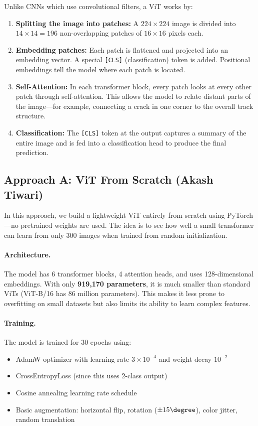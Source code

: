 \documentclass[10pt,twocolumn,letterpaper]{article}
\begin{document}
Unlike CNNs which use convolutional filters, a ViT works by:
\begin{enumerate}[leftmargin=*, itemsep=2pt]
    \item \textbf{Splitting the image into patches:} A $224\times224$ image is divided into $14 \times 14 = 196$ non-overlapping patches of $16 \times 16$ pixels each.
    \item \textbf{Embedding patches:} Each patch is flattened and projected into an embedding vector. A special \texttt{[CLS]} (classification) token is added. Positional embeddings tell the model where each patch is located.
    \item \textbf{Self-Attention:} In each transformer block, every patch looks at every other patch through self-attention. This allows the model to relate distant parts of the image---for example, connecting a crack in one corner to the overall track structure.
    \item \textbf{Classification:} The \texttt{[CLS]} token at the output captures a summary of the entire image and is fed into a classification head to produce the final prediction.
\end{enumerate}


\subsection{Approach A: ViT From Scratch (Akash Tiwari)}

In this approach, we build a lightweight ViT entirely from scratch using PyTorch---no pretrained weights are used. The idea is to see how well a small transformer can learn from only 300 images when trained from random initialization.

\paragraph{Architecture.}
The model has 6 transformer blocks, 4 attention heads, and uses 128-dimensional embeddings. With only \textbf{919,170 parameters}, it is much smaller than standard ViTs (ViT-B/16 has 86 million parameters). This makes it less prone to overfitting on small datasets but also limits its ability to learn complex features.

\paragraph{Training.}
The model is trained for 30 epochs using:
\begin{itemize}[leftmargin=*, itemsep=1pt]
    \item AdamW optimizer with learning rate $3 \times 10^{-4}$ and weight decay $10^{-2}$
    \item CrossEntropyLoss (since this uses 2-class output)
    \item Cosine annealing learning rate schedule
    \item Basic augmentation: horizontal flip, rotation ($\pm15\degree$), color jitter, random translation
\end{itemize}
\end{document}
